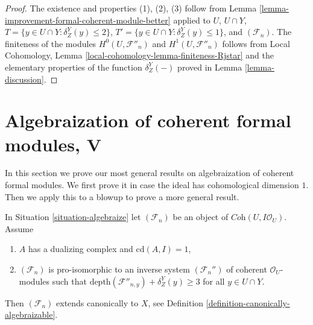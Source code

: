 \begin{proof}
The existence and properties (1), (2), (3) follow from
Lemma \ref{lemma-improvement-formal-coherent-module-better} applied
to $U$, $U \cap Y$, $T = \{y \in U \cap Y : \delta^Y_Z(y) \leq 2\}$,
$T' = \{y \in U \cap Y : \delta^Y_Z(y) \leq 1\}$, and $(\mathcal{F}_n)$.
The finiteness of the modules $H^0(U, \mathcal{F}''_n)$ and
$H^1(U, \mathcal{F}''_n)$ follows from
Local Cohomology, Lemma \ref{local-cohomology-lemma-finiteness-Rjstar}
and the elementary properties of the function $\delta^Y_Z(-)$
proved in Lemma \ref{lemma-discussion}.
\end{proof}











\section{Algebraization of coherent formal modules, V}
\label{section-algebraization-modules-conclusion}

\noindent
In this section we prove our most general results on algebraization
of coherent formal modules. We first prove it in case
the ideal has cohomological dimension $1$. Then we apply this
to a blowup to prove a more general result.

\begin{lemma}
\label{lemma-cd-1-canonical}
In Situation \ref{situation-algebraize} let $(\mathcal{F}_n)$
be an object of $\textit{Coh}(U, I\mathcal{O}_U)$. Assume
\begin{enumerate}
\item $A$ has a dualizing complex and $\text{cd}(A, I) = 1$,
\item $(\mathcal{F}_n)$ is pro-isomorphic to an inverse system
$(\mathcal{F}_n'')$ of coherent $\mathcal{O}_U$-modules such that
$\text{depth}(\mathcal{F}''_{n, y}) + \delta^Y_Z(y) \geq 3$
for all $y \in U \cap Y$.
\end{enumerate}
Then $(\mathcal{F}_n)$ extends canonically to $X$, see
Definition \ref{definition-canonically-algebraizable}.
\end{lemma}

